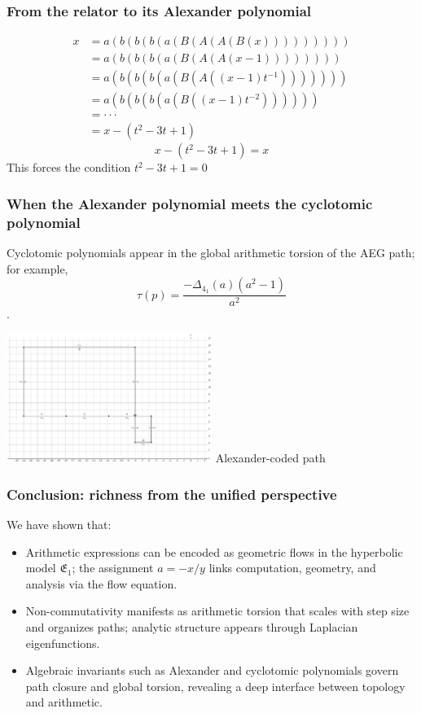 \documentclass[aspectratio=169]{beamer}
\begin{document}
\begin{frame}
    \frametitle{From the relator to its Alexander polynomial}
\begin{align*}
    x &= a(b(b(b(a(B(A(A(B(x))))))))) \\
    &= a(b(b(b(a(B(A(A(x - 1)))))))) \\
    &= a(b(b(b(a(B(A((x - 1)t^{-1}))))))) \\
    &= a(b(b(b(a(B((x - 1)t^{-2})))))) \\
    &= \cdot\cdot\cdot  \\
    &= x - (t^2 - 3t + 1)
\end{align*}
\[
x - (t^2 - 3t + 1) = x
\]
This forces the condition $t^2 - 3t + 1 = 0$
\end{frame}

\begin{frame}
    \frametitle{When the Alexander polynomial meets the cyclotomic polynomial}
    Cyclotomic polynomials appear in the global arithmetic torsion of the AEG path; for example, $$\tau(p) = \frac{-\Delta_{4_1}(a)(a^2-1)}{a^2}$$.
    \begin{center}
        \includegraphics[width=0.5\textwidth]{../images/alexander_4_1}
        {\small Alexander-coded path}
    \end{center}
\end{frame}

\begin{frame}
    \frametitle{Conclusion: richness from the unified perspective}
    We have shown that:
    \begin{itemize}
        \item Arithmetic expressions can be encoded as geometric flows in the hyperbolic model $\mathfrak{E}_1$; the assignment $a=-x/y$ links computation, geometry, and analysis via the flow equation.
        \item Non-commutativity manifests as arithmetic torsion that scales with step size and organizes paths; analytic structure appears through Laplacian eigenfunctions.
        \item Algebraic invariants such as Alexander and cyclotomic polynomials govern path closure and global torsion, revealing a deep interface between topology and arithmetic.
    \end{itemize}
\end{frame}
\end{document}
